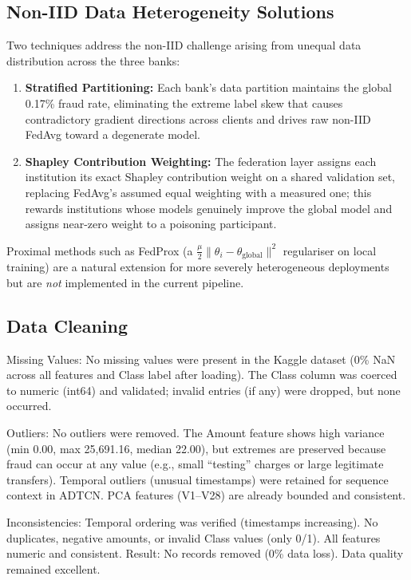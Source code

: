 \subsection*{Non-IID Data Heterogeneity Solutions}

Two techniques address the non-IID challenge arising from unequal data distribution across the three banks:

\begin{enumerate}
    \item \textbf{Stratified Partitioning:} Each bank's data partition maintains the global 0.17\% fraud rate, eliminating the extreme label skew that causes contradictory gradient directions across clients and drives raw non-IID FedAvg toward a degenerate model.
    \item \textbf{Shapley Contribution Weighting:} The federation layer assigns each institution its exact Shapley contribution weight on a shared validation set, replacing FedAvg's assumed equal weighting with a measured one; this rewards institutions whose models genuinely improve the global model and assigns near-zero weight to a poisoning participant.
\end{enumerate}

Proximal methods such as FedProx (a $\frac{\mu}{2}\|\theta_i - \theta_{\text{global}}\|^2$ regulariser on local training) are a natural extension for more severely heterogeneous deployments but are \emph{not} implemented in the current pipeline.

\subsection{Data Cleaning}

Missing Values: No missing values were present in the Kaggle dataset (0\% NaN across all features and Class label after loading). The Class column was coerced to numeric (int64) and validated; invalid entries (if any) were dropped, but none occurred.

Outliers: No outliers were removed. The Amount feature shows high variance (min 0.00, max 25,691.16, median 22.00), but extremes are preserved because fraud can occur at any value (e.g., small ``testing'' charges or large legitimate transfers). Temporal outliers (unusual timestamps) were retained for sequence context in ADTCN. PCA features (V1–V28) are already bounded and consistent.

Inconsistencies: Temporal ordering was verified (timestamps increasing). No duplicates, negative amounts, or invalid Class values (only 0/1). All features numeric and consistent. Result: No records removed (0\% data loss). Data quality remained excellent.

